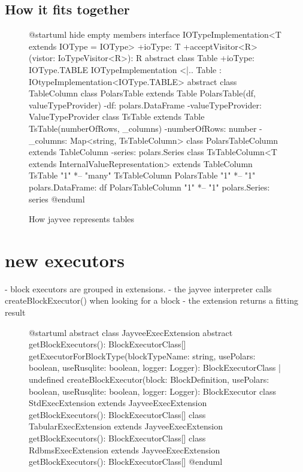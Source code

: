 \subsection{How it fits together}
\begin{figure}
	\begin{plantuml}
		@startuml
		hide empty members
		interface IOTypeImplementation<T extends IOType = IOType> {
				+ioType: T
				+acceptVisitor<R>(vistor: IoTypeVisitor<R>): R
			}
		abstract class Table {
				+ioType: IOType.TABLE
			}
		IOTypeImplementation <|.. Table : IOtypeImplementation<IOType.TABLE>
		abstract class TableColumn {
			}
		class PolarsTable extends Table {
				PolarsTable(df, valueTypeProvider)
				-df: polars.DataFrame
				-valueTypeProvider: ValueTypeProvider
			}
		class TsTable extends Table {
				TsTable(numberOfRows, _columns)
				-numberOfRows: number
				-_columns: Map<string, TsTableColumn>
			}
		class PolarsTableColumn extends TableColumn {
				-series: polars.Series
			}
		class TsTableColumn<T extends InternalValueRepresentation> extends TableColumn {
			}
		TsTable "1" *-- "many" TsTableColumn
		PolarsTable "1" *-- "1" polars.DataFrame: df
		PolarsTableColumn "1" *-- "1" polars.Series: series
		@enduml
	\end{plantuml}
	\caption{How jayvee represents tables} %
	\label{fig:current_sit}
\end{figure}

\section{new executors}
- block executors are grouped in extensions.
- the jayvee interpreter calls createBlockExecutor() when looking for a block
- the extension returns a fitting result
\begin{figure}
	\begin{plantuml}
		@startuml
		abstract class JayveeExecExtension {
				{abstract} getBlockExecutors(): BlockExecutorClass[]
				getExecutorForBlockType(blockTypeName: string, usePolars: boolean, useRusqlite: boolean, logger: Logger): BlockExecutorClass | undefined
				createBlockExecutor(block: BlockDefinition, usePolars: boolean, useRusqlite: boolean, logger: Logger): BlockExecutor
			}
		class StdExecExtension extends JayveeExecExtension {
				getBlockExecutors(): BlockExecutorClass[]
			}
		class TabularExecExtension extends JayveeExecExtension {
				getBlockExecutors(): BlockExecutorClass[]
			}
		class RdbmsExecExtension extends JayveeExecExtension {
				getBlockExecutors(): BlockExecutorClass[]
			}
		@enduml
	\end{plantuml}
	\caption{} %
	\label{fig:uml:jayveeexecextension}
\end{figure}


